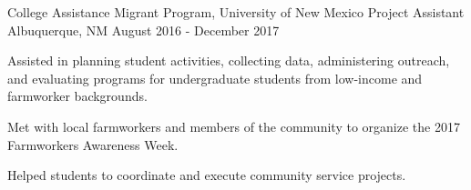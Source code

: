 \begin{cventries}
   \cventry
    {College Assistance Migrant Program, University of New Mexico } %
    {Project Assistant} %
    {Albuquerque, NM} %
    {August 2016 - December 2017} %
    {
      \begin{cvitems} %
       \item Assisted in planning student activities, collecting data, administering outreach, and evaluating programs for undergraduate \newline students from low-income and farmworker backgrounds. 
       \item Met with local farmworkers and members of the community to organize the 2017 Farmworkers Awareness Week. 
    \item Helped students to coordinate and execute community service projects.
      \end{cvitems}
    }
    
\end{cventries}
